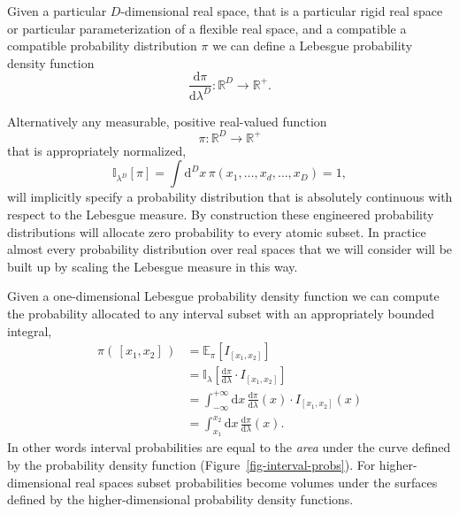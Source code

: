 \documentclass[
  letterpaper,
  DIV=11,
  numbers=noendperiod]{scrartcl}
\begin{document}
Given a particular \(D\)-dimensional real space, that is a particular
rigid real space or particular parameterization of a flexible real
space, and a compatible a compatible probability distribution \(\pi\) we
can define a Lebesgue probability density function \[
\frac{ \mathrm{d} \pi }{ \mathrm{d} \lambda^{D} } :
\mathbb{R}^{D} \rightarrow \mathbb{R}^{+}.
\]

Alternatively any measurable, positive real-valued function \[
\pi : \mathbb{R}^{D} \rightarrow \mathbb{R}^{+}
\] that is appropriately normalized, \[
\mathbb{I}_{\lambda^{D}}[ \pi ]
= \int \mathrm{d}^{D} x \, \pi(x_{1}, \ldots, x_{d}, \ldots, x_{D})
= 1,
\] will implicitly specify a probability distribution that is absolutely
continuous with respect to the Lebesgue measure. By construction these
engineered probability distributions will allocate zero probability to
every atomic subset. In practice almost every probability distribution
over real spaces that we will consider will be built up by scaling the
Lebesgue measure in this way.

Given a one-dimensional Lebesgue probability density function we can
compute the probability allocated to any interval subset with an
appropriately bounded integral, \begin{align*}
\pi( \, [ x_{1}, x_{2} ] \, )
&=
\mathbb{E}_{\pi} \left[ I_{[ x_{1}, x_{2} ]} \right]
\\
&=
\mathbb{I}_{\lambda} \left[
\frac{ \mathrm{d} \pi }{ \mathrm{d} \lambda} \cdot I_{[ x_{1}, x_{2} ]}
\right]
\\
&=
\int_{-\infty}^{+\infty} \mathrm{d} x \,
\frac{ \mathrm{d} \pi }{ \mathrm{d} \lambda}(x) \cdot I_{[ x_{1}, x_{2} ]}(x)
\\
&=
\int_{x_{1}}^{x_{2}} \mathrm{d} x \,
\frac{ \mathrm{d} \pi }{ \mathrm{d} \lambda}(x).
\end{align*} In other words interval probabilities are equal to the
\emph{area} under the curve defined by the probability density function
(Figure~\ref{fig-interval-probs}). For higher-dimensional real spaces
subset probabilities become volumes under the surfaces defined by the
higher-dimensional probability density functions.
\end{document}
